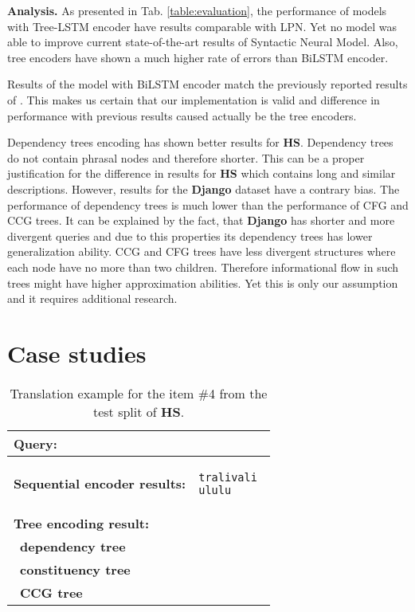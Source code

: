 \textbf{Analysis.} As presented in Tab. \ref{table:evaluation}, the performance of models with Tree-LSTM encoder have results comparable with LPN. Yet no model was able to improve current state-of-the-art results of Syntactic Neural Model. Also, tree encoders have shown a much higher rate of errors than BiLSTM encoder.

Results of the model with BiLSTM encoder match the previously reported results of \cite{Yin2017}. This makes us certain that our implementation is valid and difference in performance with previous results caused actually be the tree encoders.

Dependency trees encoding has shown better results for \textbf{HS}. Dependency trees do not contain phrasal nodes and therefore shorter. This can be a proper justification for the difference in results for \textbf{HS} which contains long and similar descriptions. However, results for the \textbf{Django} dataset  have a contrary bias. The performance of dependency trees is much lower than the performance of CFG and CCG trees. It can be explained by the fact, that \textbf{Django} has shorter and more divergent queries and due to this properties its dependency trees has lower generalization ability. CCG and CFG trees have less divergent structures where each node have no more than two children. Therefore informational flow in such trees might have higher approximation abilities. Yet this is only our assumption and it requires additional research.

\section{Case studies}

\begin{table}[h]
\begin{tabular}{ l m{5cm} }
\hline
\textbf{Query:} &  \\
\hline 
\hline 
\textbf{Sequential encoder results:} & 
\begin{verbatim} 
tralivali 
ululu
\end{verbatim}
\\
\hline
\textbf{Tree encoding result:} & \\
\hline
\ \textbf{dependency tree} & 
\\
\hline
\ \textbf{constituency tree} & 
\\
\hline
\ \textbf{CCG tree} & 
\\
\hline
\end{tabular}
\caption[Translation example for HS]{Translation example for the item \#4 from the test split of \textbf{HS}.}
\label{table:hs_case}
\end{table}


